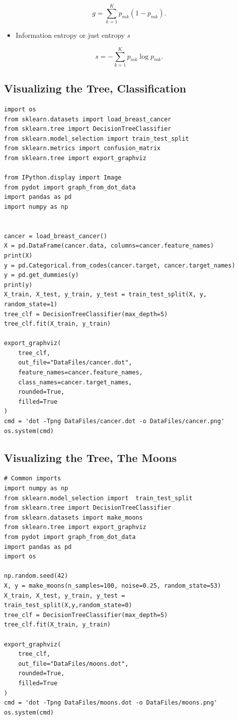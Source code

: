\documentclass[%
oneside,                 %
final,                   %
10pt]{article}
\begin{document}
\noindent
\[
g = \sum_{k=1}^K p_{mk}(1-p_{mk}).
\]
\begin{itemize}
\item Information entropy or just entropy $s$
\end{itemize}

\noindent
\[
s = -\sum_{k=1}^K p_{mk}\log{p_{mk}}.
\]


\subsection*{Visualizing the Tree, Classification}
\begin{verbatim}
import os
from sklearn.datasets import load_breast_cancer
from sklearn.tree import DecisionTreeClassifier
from sklearn.model_selection import train_test_split
from sklearn.metrics import confusion_matrix
from sklearn.tree import export_graphviz

from IPython.display import Image 
from pydot import graph_from_dot_data
import pandas as pd
import numpy as np


cancer = load_breast_cancer()
X = pd.DataFrame(cancer.data, columns=cancer.feature_names)
print(X)
y = pd.Categorical.from_codes(cancer.target, cancer.target_names)
y = pd.get_dummies(y)
print(y)
X_train, X_test, y_train, y_test = train_test_split(X, y, random_state=1)
tree_clf = DecisionTreeClassifier(max_depth=5)
tree_clf.fit(X_train, y_train)

export_graphviz(
    tree_clf,
    out_file="DataFiles/cancer.dot",
    feature_names=cancer.feature_names,
    class_names=cancer.target_names,
    rounded=True,
    filled=True
)
cmd = 'dot -Tpng DataFiles/cancer.dot -o DataFiles/cancer.png'
os.system(cmd)
\end{verbatim}

\subsection*{Visualizing the Tree, The Moons}
\begin{verbatim}
# Common imports
import numpy as np
from sklearn.model_selection import  train_test_split 
from sklearn.tree import DecisionTreeClassifier
from sklearn.datasets import make_moons
from sklearn.tree import export_graphviz
from pydot import graph_from_dot_data
import pandas as pd
import os

np.random.seed(42)
X, y = make_moons(n_samples=100, noise=0.25, random_state=53)
X_train, X_test, y_train, y_test = train_test_split(X,y,random_state=0)
tree_clf = DecisionTreeClassifier(max_depth=5)
tree_clf.fit(X_train, y_train)

export_graphviz(
    tree_clf,
    out_file="DataFiles/moons.dot",
    rounded=True,
    filled=True
)
cmd = 'dot -Tpng DataFiles/moons.dot -o DataFiles/moons.png'
os.system(cmd)
\end{verbatim}
\end{document}
